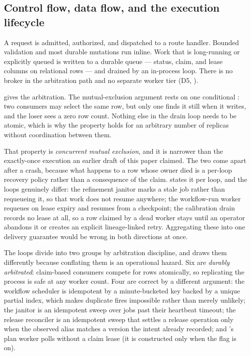 \subsection{Control flow, data flow, and the execution lifecycle}
\label{sec:exec}




 A request is admitted, authorized, and dispatched to a route
handler. Bounded validation and most durable mutations run inline. Work that is
long-running or explicitly queued is written to a durable queue --- status, claim,
and lease columns on relational rows --- and drained by an in-process loop. There
is no broker in the arbitration path and no separate worker tier (D5,
).

 gives the arbitration. The mutual-exclusion argument rests on
one conditional : two consumers may select the same row, but only one
finds it still  when it writes, and the loser sees a zero row count.
Nothing else in the drain loop needs to be atomic, which is why the property holds
for an arbitrary number of replicas without coordination between them.

That property is \emph{concurrent mutual exclusion}, and it is narrower than the
exactly-once execution an earlier draft of this paper claimed. The two come apart
after a crash, because what happens to a row whose owner died is a per-loop
recovery policy rather than a consequence of the claim.  states
it per loop, and the loops genuinely differ: the refinement janitor marks a stale
job  rather than requeueing it, so that work does not resume
anywhere; the workflow-run worker requeues on lease expiry and resumes from a
checkpoint; the calibration drain records no lease at all, so a row claimed by a
dead worker stays  until an operator abandons it or creates an
explicit lineage-linked retry. Aggregating these into one delivery
guarantee would be wrong in both directions at once.



The \statLoopsW{} loops divide into two groups by arbitration discipline, and
 draws them differently because conflating them is an
operational hazard. Six are \emph{durably arbitrated}: claim-based consumers
compete for rows atomically, so replicating the process is safe at any worker
count. Four are correct by a different argument: the workflow scheduler is
idempotent by a minute-bucketed key backed by a unique partial index, which makes
duplicate fires impossible rather than merely unlikely; the janitor is an
idempotent sweep over jobs past their heartbeat timeout; the release reconciler is
an idempotent sweep that settles a release operation only when the observed alias
matches a version the intent already recorded; and \aria{}'s plan worker polls
without a claim lease (it is constructed only when the \aria{} flag is on).


